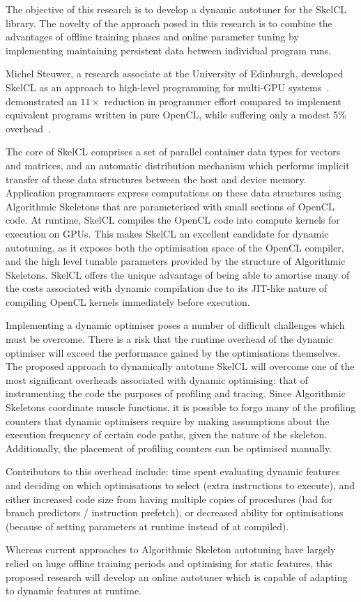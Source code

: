 The objective of this research is to develop a dynamic autotuner for
the SkelCL library. The novelty of the approach posed in this research
is to combine the advantages of offline training phases and online
parameter tuning by implementing maintaining persistent data between
individual program runs.

Michel Steuwer, a research associate at the University of Edinburgh,
developed SkelCL as an approach to high-level programming for
multi-GPU systems~\cite{Steuwer2011,
Steuwer2013a}. \citeauthor{Steuwer2012} demonstrated an $11\times$
reduction in programmer effort compared to implement equivalent
programs written in pure OpenCL, while suffering only a modest 5\%
overhead~\cite{Steuwer2012}.

The core of SkelCL comprises a set of parallel container data types
for vectors and matrices, and an automatic distribution mechanism
which performs implicit transfer of these data structures between the
host and device memory. Application programmers express computations
on these data structures using Algorithmic Skeletons that are
parameterised with small sections of OpenCL code. At runtime, SkelCL
compiles the OpenCL code into compute kernels for execution on
GPUs. This makes SkelCL an excellent candidate for dynamic autotuning,
as it exposes both the optimisation space of the OpenCL compiler, and
the high level tunable parameters provided by the structure of
Algorithmic Skeletons.
SkelCL offers the unique advantage of being able to amortise many of
the costs associated with dynamic compilation due to its JIT-like
nature of compiling OpenCL kernels immediately before execution.

Implementing a dynamic optimiser poses a number of difficult
challenges which must be overcome.
There is a risk that the runtime overhead of the dynamic optimiser
will exceed the performance gained by the optimisations
themselves. The proposed approach to dynamically autotune SkelCL will
overcome one of the most significant overheads associated with dynamic
optimising: that of instrumenting the code the purposes of profiling
and tracing. Since Algorithmic Skeletons coordinate muscle functions,
it is possible to forgo many of the profiling counters that dynamic
optimisers require by making assumptions about the execution frequency
of certain code paths, given the nature of the skeleton. Additionally,
the placement of profiling counters can be optimised manually.

Contributors to this overhead include: time spent evaluating dynamic
features and deciding on which optimisations to select (extra
instructions to execute), and either increased code size from having
multiple copies of procedures (bad for branch predictors / instruction
prefetch), or decreased ability for optimisations (because of setting
parameters at runtime instead of at compiled).

Whereas current approaches to Algorithmic Skeleton autotuning have
largely relied on huge offline training periods and optimising for
static features, this proposed research will develop an online
autotuner which is capable of adapting to dynamic features at runtime.
